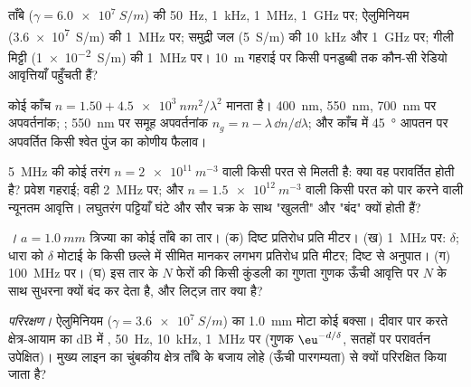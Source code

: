 \begin{exercise}[$\star$]\label{exo:b2:waves-in-media:2}
ताँबे ($\gamma = \qty{6.0e7}{S/m}$) की  \qty{50}{Hz}, \qty{1}{kHz},
\qty{1}{MHz}, \qty{1}{GHz} पर; ऐलुमिनियम (\qty{3.6e7}{S/m}) की \qty{1}{MHz} पर; समुद्री
जल (\qty{5}{S/m}) की \qty{10}{kHz} और \qty{1}{GHz} पर; गीली मिट्टी (\qty{1e-2}{S/m})
की \qty{1}{MHz} पर। \qty{10}{m} गहराई पर किसी पनडुब्बी तक कौन-सी रेडियो आवृत्तियाँ पहुँचती हैं?
\end{exercise}

\begin{exercise}[$\star$]\label{exo:b2:waves-in-media:3}
कोई काँच $n = 1.50 + \qty{4.5e3}{nm^2}/\lambda^2$ मानता है। \qty{400}{nm},
\qty{550}{nm}, \qty{700}{nm} पर अपवर्तनांक; ; \qty{550}{nm} पर
समूह अपवर्तनांक $n_g = n -
\lambda\,\dd n/\dd\lambda$; और काँच में \qty{45}{\degree} आपतन पर अपवर्तित किसी श्वेत पुंज का कोणीय फैलाव।
\end{exercise}

\begin{exercise}[$\star$]\label{exo:b2:waves-in-media:4}
\qty{5}{MHz} की कोई तरंग $n = \qty{2e11}{m^{-3}}$ वाली किसी परत से मिलती है: क्या वह
परावर्तित होती है? प्रवेश गहराई; वही \qty{2}{MHz} पर; और $n = \qty{1.5e12}{m^{-3}}$
वाली किसी परत को पार करने वाली न्यूनतम आवृत्ति। लघुतरंग
पट्टियाँ घंटे और सौर चक्र के साथ "खुलती" और "बंद" क्यों होती हैं?
\end{exercise}

\begin{exercise}[$\star\star$]\label{exo:b2:waves-in-media:5}
\emph{।} $a = \qty{1.0}{mm}$ त्रिज्या का कोई ताँबे का तार। (क) दिष्ट
प्रतिरोध प्रति मीटर। (ख) \qty{1}{MHz} पर: $\delta$; धारा को $\delta$ मोटाई के किसी छल्ले में
सीमित मानकर लगभग प्रतिरोध प्रति मीटर;
दिष्ट से अनुपात। (ग) \qty{100}{MHz} पर। (घ) इस तार के $N$ फेरों की किसी कुंडली का
गुणता गुणक ऊँची आवृत्ति पर $N$ के साथ सुधरना क्यों बंद कर देता है, और लिट्ज़ तार क्या है?
\end{exercise}

\begin{exercise}[$\star\star$]\label{exo:b2:waves-in-media:6}
\emph{परिरक्षण।} ऐलुमिनियम ($\gamma = \qty{3.6e7}{S/m}$) का \qty{1.0}{mm}
मोटा कोई बक्सा। दीवार पार करते क्षेत्र-आयाम का dB में ,
\qty{50}{Hz}, \qty{10}{kHz}, \qty{1}{MHz} पर (गुणक $\eu^{-d/\delta}$, सतहों पर परावर्तन
उपेक्षित)। मुख्य लाइन का चुंबकीय क्षेत्र ताँबे के बजाय लोहे (ऊँची
पारगम्यता) से क्यों परिरक्षित किया जाता है?
\end{exercise}

